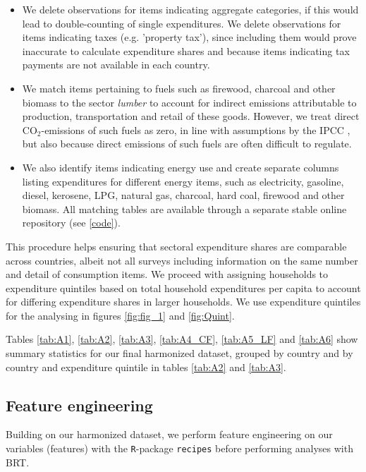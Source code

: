 \documentclass[12pt, a4paper]{article}
\begin{document}
\begin{refsection}
\begin{itemize}
    \item We delete observations for items indicating aggregate categories, if this would lead to double-counting of single expenditures. We delete observations for items indicating taxes (e.g. 'property tax'), since including them would prove inaccurate to calculate expenditure shares and because items indicating tax payments are not available in each country.
    \item We match items pertaining to fuels such as firewood, charcoal and other biomass to the sector \textit{lumber} to account for indirect emissions attributable to production, transportation and retail of these goods. However, we treat direct CO$_{2}$-emissions of such fuels as zero, in line with assumptions by the IPCC \autocite{Grad.2023}, but also because direct emissions of such fuels are often difficult to regulate.
    \item We also identify items indicating energy use and create separate columns listing expenditures for different energy items, such as electricity, gasoline, diesel, kerosene, LPG, natural gas, charcoal, hard coal, firewood and other biomass. All matching tables are available through a separate stable online repository (see \ref{code}).
\end{itemize}

This procedure helps ensuring that sectoral expenditure shares are comparable across countries, albeit not all surveys including information on the same number and detail of consumption items. We proceed with assigning households to expenditure quintiles based on total household expenditures per capita to account for differing expenditure shares in larger households. We use expenditure quintiles for the analysing in figures \ref{fig:fig_1} and \ref{fig:Quint}.

Tables \ref{tab:A1}, \ref{tab:A2}, \ref{tab:A3}, \ref{tab:A4_CF}, \ref{tab:A5_LF} and \ref{tab:A6} show summary statistics for our final harmonized dataset, grouped by country and by country and expenditure quintile in tables \ref{tab:A2} and \ref{tab:A3}. 


\subsection{Feature engineering} \label{sec:featureengineering}

Building on our harmonized dataset, we perform feature engineering on our variables (features) with the \texttt{R}-package \texttt{recipes} before performing analyses with BRT.


\end{refsection}
\end{document}
